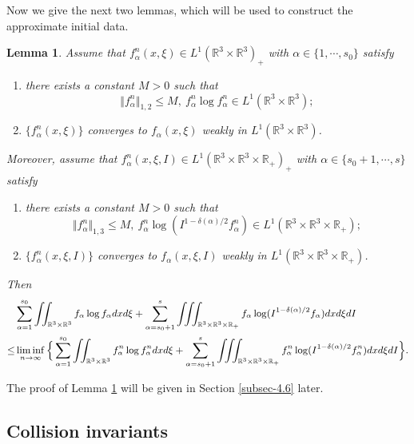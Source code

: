 \documentclass[reqno,11pt]{amsart}
\newtheorem{lemma}{Lemma}[section]
\numberwithin{equation}{section}
\def\R{\mathbb{R}}
\begin{document}
Now we give the next two lemmas, which will be used to construct the approximate initial data.

\begin{lemma}\label{Lemma 4.6}
	Assume that $f^n_\alpha(x,\xi ) \in L^1(\R^3\times \R^3)_+$ with $\alpha \in \{1,\cdots,s_0\}$ satisfy
	\begin{enumerate}
		\item {there exists a constant $M >0$ such that 
			$$\Vert f^n_\alpha\Vert_{1,2} \leq M ,\ f^n_\alpha \log f^n_\alpha \in L^1(\R^3\times \R^3); $$ }
		\item {$\{ f^n_\alpha (x,\xi ) \} $ converges to $f_\alpha (x,\xi ) $ weakly in $ L^1(\R^3 \times \R^3 ) $. }
	\end{enumerate}
Moreover, assume that $f^n_\alpha(x,\xi ,I) \in L^1(\R^3\times \R^3 \times \R_+)_+$ with $\alpha \in \{s_0+1,\cdots,s\}$ satisfy
	\begin{enumerate}
		\item[(3)] {there exists a constant $M >0$ such that 
			$$\Vert f^n_\alpha \Vert_{1,3} \leq M ,\ f^n_\alpha \log (I^{1-\delta(\alpha)/2}f^n_\alpha) \in L^1(\R^3 \times \R^3\times \R_+ ); $$ }
		\item[(4)] {$\{ f^n_\alpha(x,\xi ,I) \} $  converges  to $f_\alpha(x,\xi,I ) $ weakly in $  L^1(\R^3 \times \R^3\times \R_+) $. }
	\end{enumerate}
	Then 
	\begin{equation}\label{eq4.28}{\small
    \begin{aligned}
		& \sum_{\alpha = 1}^{s_0} \iint_{\R^3 \times \R^3} f_\alpha \log f_\alpha dxd\xi + \sum_{\alpha = s_0 + 1}^{s} \iiint_{\R^3 \times \R^3\times \R_+ } f_\alpha \log (I^{1-\delta(\alpha )/2 } f_\alpha) dxd\xi dI \\
\leq & \liminf \limits_{n\rightarrow \infty } \Big\{ \sum_{\alpha = 1}^{s_0} \iint_{\R^3 \times \R^3 } f^n_\alpha \log f^n_\alpha dxd\xi + \sum_{\alpha = s_0 + 1}^{s} \iiint_{\R^3 \times \R^3\times \R_+ } f^n_\alpha \log (I^{1-\delta(\alpha)/2}f^n_\alpha) dxd\xi dI \Big\} .
\end{aligned}}
	\end{equation} 
\end{lemma}

The proof of Lemma \ref{Lemma 4.6} will be given in Section \ref{subsec-4.6} later.


\subsection{Collision invariants}
\end{document}
